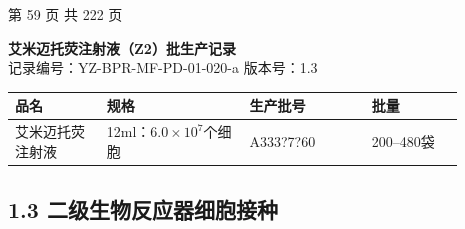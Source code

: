 \documentclass[UTF8,10pt,a4paper,fontset=fandol]{ctexart}
\newcommand{\fieldvalue}[1]{#1}
\newcommand{\handwritten}[1]{#1}
\begin{document}
\vfill

\begin{center}
第 59 页 共 222 页
\end{center}

\newpage

\begin{center}
\textbf{艾米迈托荧注射液（Z2）批生产记录}\\
记录编号：YZ-BPR-MF-PD-01-020-a \qquad 版本号：1.3
\end{center}

\begin{center}
\begin{tabular}{|p{0.18\linewidth}|p{0.29\linewidth}|p{0.24\linewidth}|p{0.18\linewidth}|}
\hline
品名 & 规格 & 生产批号 & 批量\\
\hline
\fieldvalue{艾米迈托荧注射液}
&
\fieldvalue{12ml：$6.0\times10^{7}$个细胞}
&
\fieldvalue{\handwritten{A333?7?60}}
&
\fieldvalue{200--480袋}
\\
\hline
\end{tabular}
\end{center}

\subsection*{1.3 二级生物反应器细胞接种}
\end{document}
